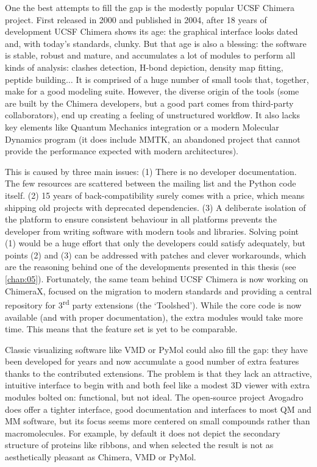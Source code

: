 One the best attempts to fill the gap is the modestly popular UCSF Chimera project. First released in 2000\cite{firstchimera} and published in 2004,\cite{chimera} after 18 years of development UCSF Chimera shows its age: the graphical interface looks dated and, with today’s standards, clunky. But that age is also a blessing: the software is stable, robust and mature, and accumulates a lot of modules to perform all kinds of analysis: clashes detection, H-bond depiction, density map fitting, peptide building$ \ldots $  It is comprised of a huge number of small tools that, together, make for a good modeling suite. However, the diverse origin of the tools (some are built by the Chimera developers, but a good part comes from third-party collaborators), end up creating a feeling of unstructured workflow. It also lacks key elements like Quantum Mechanics integration or a modern Molecular Dynamics program (it does include MMTK, an abandoned project that cannot provide the performance expected with modern architectures).

This is caused by three main issues: (1) There is no developer documentation. The few resources are scattered between the mailing list and the Python code itself. (2) 15 years of back-compatibility surely comes with a price, which means shipping old projects with deprecated dependencies. (3) A deliberate isolation of the platform to ensure consistent behaviour in all platforms prevents the developer from writing software with modern tools and libraries. Solving point (1) would be a huge effort that only the developers could satisfy adequately, but points (2) and (3) can be addressed with patches and clever workarounds, which are the reasoning behind one of the developments presented in this thesis (see \autoref{chap:05}). Fortunately, the same team behind UCSF Chimera is now working on ChimeraX, focused on the migration to modern standards and providing a central repository for 3\textsuperscript{rd} party extensions (the ‘Toolshed’). While the core code is now available (and with proper documentation), the extra modules would take more time. This means that the feature set is yet to be comparable.

Classic visualizing software like VMD or PyMol could also fill the gap: they have been developed for years and now accumulate a good number of extra features thanks to the contributed extensions. The problem is that they lack an attractive, intuitive interface to begin with and both feel like a modest 3D viewer with extra modules bolted on: functional, but not ideal. The open-source project Avogadro does offer a tighter interface, good documentation and interfaces to most QM and MM software, but its focus seems more centered on small compounds rather than macromolecules. For example, by default it does not depict the secondary structure of proteins like ribbons, and when selected the result is not as aesthetically pleasant as Chimera, VMD or PyMol.

